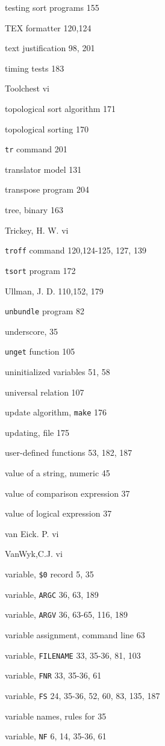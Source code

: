 \begin{multicols}{2}
testing sort programs 155

TEX formatter 120,124

text justification 98, 201

timing tests 183

Toolchest vi

topological sort algorithm 171

topological sorting 170

\verb'tr' command 201

translator model 131

transpose program 204

tree, binary 163

Trickey, H. W. vi

\verb'troff' command 120,124-125, 127, 139

\verb'tsort' program 172





Ullman, J. D. 110,152, 179

\verb'unbundle' program 82

underscore, 35

\verb'unget' function 105

uninitialized variables 51, 58

universal relation 107

update algorithm, \verb'make' 176

updating, file 175

user-defined functions 53, 182,  187

value of a string, numeric 45

value of comparison expression 37

value of logical expression 37

van Eick. P. vi

VanWyk,C.J. vi

variable, \verb'$0' record 5, 35

variable, \verb'ARGC' 36, 63, 189

variable, \verb'ARGV' 36, 63-65, 116, 189

variable assignment, command line 63

variable, \verb'FILENAME' 33, 35-36, 81, 103

variable, \verb'FNR' 33, 35-36, 61

variable, \verb'FS' 24, 35-36, 52, 60, 83, 135, 187

variable names, rules for 35

variable, \verb'NF' 6, 14, 35-36, 61


\end{multicols}

